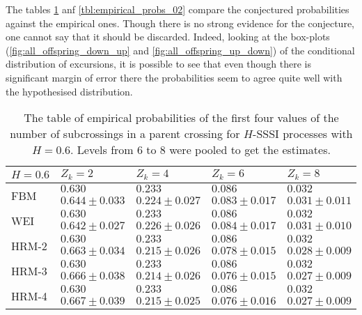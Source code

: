 The tables \ref{tbl:empirical_probs_01} anf \ref{tbl:empirical_probs_02} compare the 
conjectured probabilities against the empirical ones. Though there is no strong evidence
for the conjecture, one cannot say that it should be discarded. Indeed, looking at
the box-plots (\ref{fig:all_offspring_down_up} and \ref{fig:all_offspring_up_down})
of the conditional distribution of excursions, it is possible to see that even
though there is significant margin of error there the probabilities seem to agree
quite well with the hypothesised distribution.
\begin{table}[h]\begin{center}
	\begin{tabular}{l||l|l|l|l|}
					$H=0.6$ & $Z_k = 2$ & $Z_k = 4$ & $Z_k = 6$ & $Z_k = 8$ \\ \hline\hline
	\multirow{2}{*}{FBM} 	& $0.630$ & $0.233$ & $0.086$ & $0.032$ \\ \cline{2-5}
							& $0.644\pm0.033$ & $0.224\pm0.027$ & $0.083\pm0.017$ & $0.031\pm0.011$ \\ \hline\hline
	\multirow{2}{*}{WEI} 	& $0.630$ & $0.233$ & $0.086$ & $0.032$ \\ \cline{2-5}
							& $0.642\pm0.027$ & $0.226\pm0.026$ & $0.084\pm0.017$ & $0.031\pm0.010$ \\ \hline\hline
	\multirow{2}{*}{HRM-2} 	& $0.630$ & $0.233$ & $0.086$ & $0.032$ \\ \cline{2-5}
							& $0.663\pm0.034$ & $0.215\pm0.026$ & $0.078\pm0.015$ & $0.028\pm0.009$ \\ \hline\hline
	\multirow{2}{*}{HRM-3} 	& $0.630$ & $0.233$ & $0.086$ & $0.032$ \\ \cline{2-5}
							& $0.666\pm0.038$ & $0.214\pm0.026$ & $0.076\pm0.015$ & $0.027\pm0.009$ \\ \hline\hline
	\multirow{2}{*}{HRM-4} 	& $0.630$ & $0.233$ & $0.086$ & $0.032$ \\ \cline{2-5}
							& $0.667\pm0.039$ & $0.215\pm0.025$ & $0.076\pm0.016$ & $0.027\pm0.009$ \\ \hline\hline
	\end{tabular}
	\caption{The table of empirical probabilities of the first four values of the number
	of subcrossings in a parent crossing for $H$-SSSI processes with $H=0.6$. Levels from
	6 to 8 were pooled to get the estimates.}
\label{tbl:empirical_probs_01}
\end{center}\end{table}

